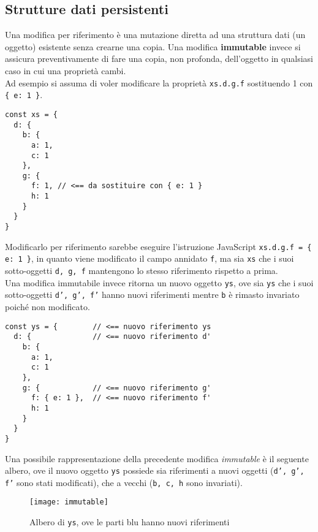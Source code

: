 \subsection{Strutture dati persistenti}

Una modifica per riferimento è una mutazione diretta ad una struttura dati (un oggetto) esistente senza crearne una copia. Una modifica \textbf{immutable} invece si assicura preventivamente di fare una copia, non profonda, dell'oggetto in qualsiasi caso in cui una proprietà cambi. \\

Ad esempio si assuma di voler modificare la proprietà \texttt{xs.d.g.f} sostituendo 1 con \texttt{\{ e: 1 \}}. 

\begin{lstlisting}[language={[Sharp]C},basicstyle=\footnotesize]
const xs = {
  d: {
    b: {
      a: 1,
      c: 1
    },
    g: {
      f: 1, // <== da sostituire con { e: 1 }
      h: 1
    }
  }
}
\end{lstlisting}

Modificarlo per riferimento sarebbe eseguire l'istruzione JavaScript \texttt{xs.d.g.f = \{ e: 1 \}}, in quanto viene modificato il campo annidato \texttt{f}, ma sia \texttt{xs} che i suoi sotto-oggetti \texttt{d, g, f} mantengono lo stesso riferimento rispetto a prima. \\

Una modifica immutabile invece ritorna un nuovo oggetto \texttt{ys}, ove sia \texttt{ys} che i suoi sotto-oggetti \texttt{d', g', f'} hanno nuovi riferimenti mentre \texttt{b} è rimasto invariato poiché non modificato.

\begin{lstlisting}[language={[Sharp]C},basicstyle=\footnotesize]
const ys = {        // <== nuovo riferimento ys
  d: {              // <== nuovo riferimento d'
    b: {
      a: 1,
      c: 1
    },
    g: {            // <== nuovo riferimento g'
      f: { e: 1 },  // <== nuovo riferimento f'
      h: 1
    }
  }
}
\end{lstlisting}

Una possibile rappresentazione della precedente modifica \textit{immutable} è il seguente albero, ove il nuovo oggetto \texttt{ys} possiede sia riferimenti a nuovi oggetti (\texttt{d', g', f'} sono stati modificati), che a vecchi (\texttt{b, c, h} sono invariati).

\begin{figure}[H] 
  \centering 
  \texttt{[image: immutable]} 
  \caption{Albero di \texttt{ys}, ove le parti blu hanno nuovi riferimenti}
\end{figure}

